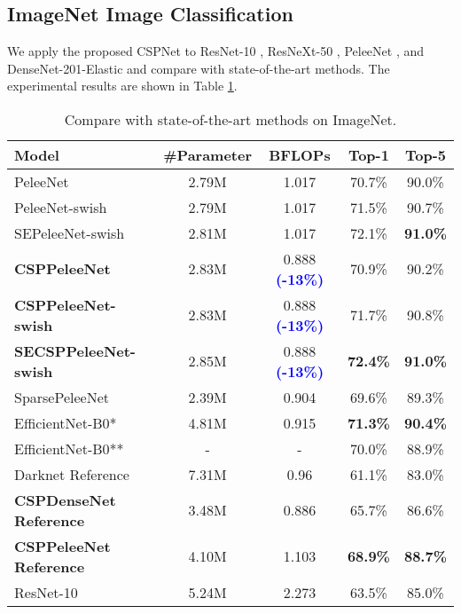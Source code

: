 \documentclass{article}
\begin{document}
\subsection{ImageNet Image Classification}

We apply the proposed CSPNet to ResNet-10 \cite{he2016deep}, ResNeXt-50 \cite{xie2017aggregated}, PeleeNet \cite{wang2018pelee}, and DenseNet-201-Elastic \cite{wang2019elastic} and compare with state-of-the-art methods.  The experimental results are shown in Table \ref{table:imagenet}.

\begin{table}[h]
	\centering
	\begin{threeparttable}[h]
		\footnotesize
\caption{Compare with state-of-the-art methods on ImageNet.}
		\label{table:imagenet}
		\setlength\tabcolsep{2.0pt}
		\begin{tabular}{lcccc}
			\toprule
			Model & \#Parameter & BFLOPs & Top-1 & Top-5 \\			
			\midrule	
			\midrule
			PeleeNet \cite{wang2018pelee} & 2.79M & 1.017 & 70.7\% & 90.0\% \\	
			PeleeNet-swish & 2.79M & 1.017 & 71.5\% & 90.7\% \\
			SEPeleeNet-swish & 2.81M & 1.017 & 72.1\% & \textbf{91.0\%} \\
			\textbf{CSPPeleeNet} & 2.83M & 0.888 \textbf{\textcolor{blue}{(-13\%)}} & 70.9\%  & 90.2\% \\	
			\textbf{CSPPeleeNet-swish} & 2.83M & 0.888 \textbf{\textcolor{blue}{(-13\%)}} & 71.7\% & 90.8\% \\
			\textbf{SECSPPeleeNet-swish} & 2.85M & 0.888 \textbf{\textcolor{blue}{(-13\%)}} & \textbf{72.4\%} & \textbf{91.0\%} \\
			SparsePeleeNet \cite{zhu2018sparsely} & 2.39M & 0.904 & 69.6\% & 89.3\% \\
			\midrule	
			EfficientNet-B0* \cite{tan2019efficientnet} & 4.81M  & 0.915 & \textbf{71.3\%} & \textbf{90.4\%} \\
			EfficientNet-B0** \cite{tan2019efficientnet} & -  & - & 70.0\% & 88.9\% \\
			\midrule
			Darknet Reference \cite{darknet13} & 7.31M & 0.96 & 61.1\% & 83.0\% \\
\textbf{CSPDenseNet Reference} & 3.48M & 0.886 & 65.7\% & 86.6\% \\
			\textbf{CSPPeleeNet Reference} & 4.10M & 1.103 & \textbf{68.9\%} & \textbf{88.7\%} \\
			\midrule
			ResNet-10 \cite{he2016deep} & 5.24M & 2.273 & 63.5\% & 85.0\% \\

\end{tabular}
\end{threeparttable}
\end{table}
\end{document}
